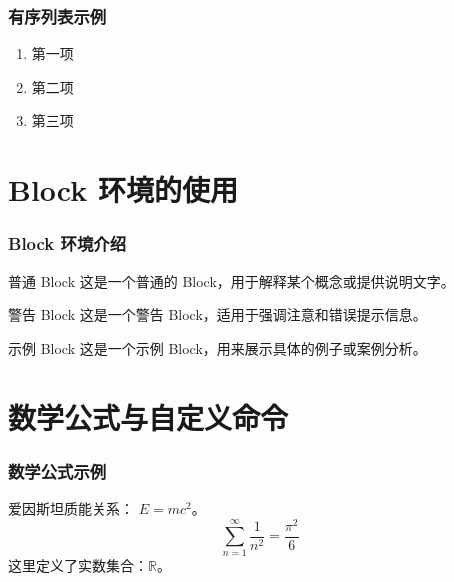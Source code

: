 \documentclass[aspectratio=169]{beamer}
\begin{document}
\begin{frame}
    \frametitle{有序列表示例}
    \begin{enumerate}
        \item 第一项
        \item 第二项
        \item 第三项
    \end{enumerate}
\end{frame}

\section{Block 环境的使用}
\begin{frame}
    \frametitle{Block 环境介绍}
    \begin{block}{普通 Block}
        这是一个普通的 Block，用于解释某个概念或提供说明文字。
    \end{block}
    
    \begin{alertblock}{警告 Block}
        这是一个警告 Block，适用于强调注意和错误提示信息。
    \end{alertblock}
    
    \begin{exampleblock}{示例 Block}
        这是一个示例 Block，用来展示具体的例子或案例分析。
    \end{exampleblock}
\end{frame}

\section{数学公式与自定义命令}
\begin{frame}
    \frametitle{数学公式示例}
    爱因斯坦质能关系： $E = mc^2$。
    \[
    \sum_{n=1}^{\infty} \frac{1}{n^2} = \frac{\pi^2}{6}
    \]
    \newcommand{\Real}{\mathbb{R}}
    这里定义了实数集合：$\Real$。
\end{frame}

\end{document}

